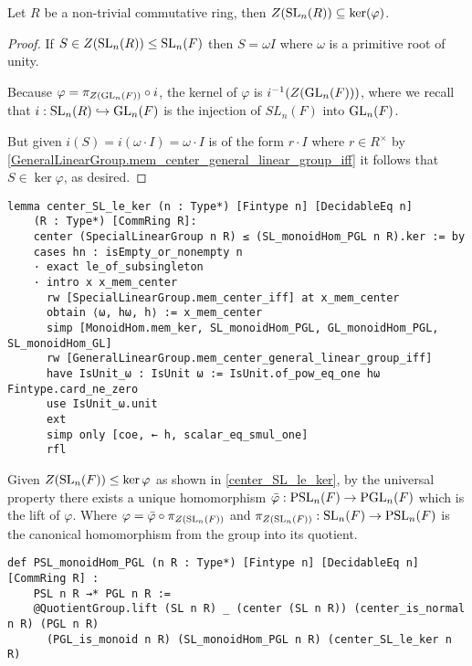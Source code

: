 \begin{lemma}
\label{center_SL_le_ker}
\leanok
Let $R$ be a non-trivial commutative ring, then $Z(\operatorname{SL}_n(R)) \subseteq \ker (\varphi)$.
\end{lemma}
\begin{proof}
\leanok
If $S \in Z(\operatorname{SL}_n(R)) \leq \operatorname{SL}_n(F)$ then $S = \omega I$ where $\omega$ is a primitive root of unity.

Because $\varphi = \pi_{Z(\operatorname{GL}_n(F))} \circ i$, the kernel of $\varphi$ is $i^{-1}(Z(\operatorname{GL}_n(F)))$, where we recall that $i : \operatorname{SL}_n(R) \hookrightarrow \operatorname{GL}_n(F)$ is the injection of $SL_n(F)$ into $\operatorname{GL}_n(F)$.

But given $i(S) = i(\omega \cdot I) = \omega \cdot I$ is of the form $r \cdot I$ where $r \in R^\times$ by \ref{GeneralLinearGroup.mem_center_general_linear_group_iff} it follows that $S \in \ker \varphi$, as desired.
\end{proof}
\begin{footnotesize}
\begin{verbatim}
lemma center_SL_le_ker (n : Type*) [Fintype n] [DecidableEq n]
    (R : Type*) [CommRing R]:
    center (SpecialLinearGroup n R) ≤ (SL_monoidHom_PGL n R).ker := by
    cases hn : isEmpty_or_nonempty n
    · exact le_of_subsingleton
    · intro x x_mem_center
      rw [SpecialLinearGroup.mem_center_iff] at x_mem_center
      obtain ⟨ω, hω, h⟩ := x_mem_center
      simp [MonoidHom.mem_ker, SL_monoidHom_PGL, GL_monoidHom_PGL, SL_monoidHom_GL]
      rw [GeneralLinearGroup.mem_center_general_linear_group_iff]
      have IsUnit_ω : IsUnit ω := IsUnit.of_pow_eq_one hω Fintype.card_ne_zero
      use IsUnit_ω.unit
      ext
      simp only [coe, ← h, scalar_eq_smul_one]
      rfl
\end{verbatim}
\end{footnotesize}



\begin{definition}
\label{PSL_monoidHom_PGL}
\leanok
    Given $Z(\operatorname{SL}_n(F)) \leq \ker \varphi$ as shown in \ref{center_SL_le_ker}, by the universal property there exists a unique homomorphism $\bar{\varphi} : \operatorname{PSL}_n(F) \rightarrow \operatorname{PGL}_n(F)$ which is the lift of $\varphi$. 
    Where $\varphi = \bar{\varphi} \circ \pi_{Z(\operatorname{SL}_n(F))}$ and $\pi_{Z(\operatorname{SL}_n(F))} : \operatorname{SL}_n(F) \rightarrow \operatorname{PSL}_n(F)$ is the canonical homomorphism from the group into its quotient.
\end{definition}
\begin{footnotesize}
\begin{verbatim}
def PSL_monoidHom_PGL (n R : Type*) [Fintype n] [DecidableEq n] [CommRing R] :
    PSL n R →* PGL n R :=
    @QuotientGroup.lift (SL n R) _ (center (SL n R)) (center_is_normal n R) (PGL n R)
      (PGL_is_monoid n R) (SL_monoidHom_PGL n R) (center_SL_le_ker n R)
  
\end{verbatim}
\end{footnotesize}




